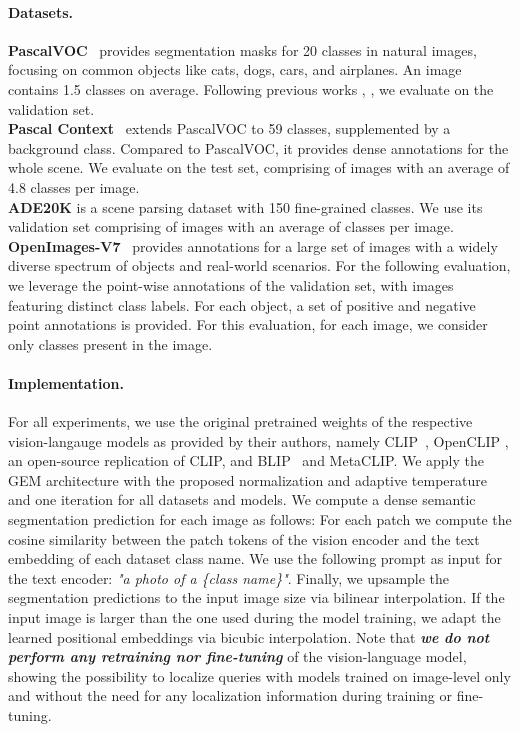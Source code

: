\documentclass[10pt,twocolumn,letterpaper]{article}
\begin{document}
\paragraph{Datasets.}
\textbf{PascalVOC}~\citep{everingham2010pascal} provides segmentation masks for 20 classes in natural images, focusing on common objects like cats, dogs, cars, and airplanes.
An image contains 1.5 classes on average.
Following previous works \citep{li2023clipsurgery}, \citep{zhou2022extract}, we evaluate on the validation set.
\\
\textbf{Pascal Context}~\citep{mottaghi2014role} extends PascalVOC to 59 classes, supplemented by a background class. Compared to PascalVOC, it provides dense annotations for the whole scene. We evaluate on the test set, comprising of  images with an average of 4.8 classes per image.
\\
\textbf{ADE20K} \citep{zhou2019sADE} is a scene parsing dataset with 150 fine-grained classes. We use its validation set comprising of  images with an average of  classes per image.
\\
\textbf{OpenImages-V7}~\citep{benenson2022colouring} provides annotations for a large set of images with a widely diverse spectrum of objects and real-world scenarios.
For the following evaluation, we leverage the point-wise annotations of the validation set, with  images featuring  distinct class labels. 
For each object, a set of positive and negative point annotations is provided. 
For this evaluation, for each image, we consider only classes present in the image. 
\vspace{-5mm}
\paragraph{Implementation.}
For all experiments, we use the original pretrained weights of the respective vision-langauge models as provided by their authors, namely CLIP~\citep{radford2021learning}, OpenCLIP \citep{cherti2023reproducible}, an open-source replication of CLIP, and BLIP~\citep{li2022blip} and MetaCLIP\citep{xu2023demystifying}.
We apply the GEM architecture with the proposed normalization and adaptive temperature and one iteration for all datasets and models. 
We compute a dense semantic segmentation prediction for each image as follows: For each patch we compute the cosine similarity between the patch tokens of the vision encoder and the text embedding of each dataset class name.
We use the following prompt as input for the text encoder: \textit{"a photo of a \{class name\}"}. 
Finally, we upsample the segmentation predictions to the input image size via bilinear interpolation.
If the input image is larger than the one used during the model training, we adapt the learned positional embeddings via bicubic interpolation.
Note that \emph{\textbf{we do not perform any retraining nor fine-tuning}} of the vision-language model, showing the possibility to localize queries with models trained on image-level only and without the need for any localization information during training or fine-tuning.
\end{document}
